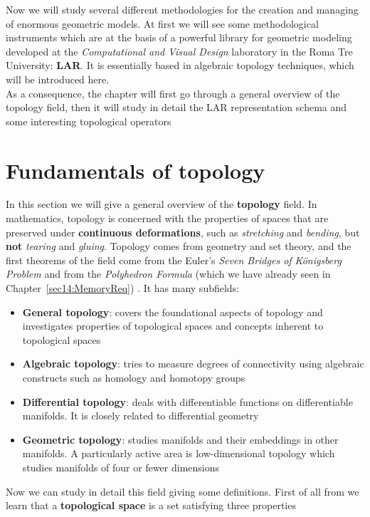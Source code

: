 Now we will study several different methodologies for the creation and managing of enormous geometric models. At first we will see some methodological instruments which are at the basis of a powerful library for geometric modeling developed at the \textit{Computational and Visual Design} laboratory in the Roma Tre University: \textbf{LAR}. It is essentially based in algebraic topology techniques, which will be introduced here.\\

As a consequence, the chapter will first go through a general overview of the topology field, then it will study in detail the LAR representation schema and some interesting topological operators

\section{Fundamentals of topology}\label{sec21:topologicalAlgebra}

In this section we will give a general overview of the \textbf{topology} field. In mathematics, topology is concerned with the properties of spaces that are preserved under \textbf{continuous deformations}, such as \textit{stretching} and \textit{bending}, but \textbf{not} \textit{tearing} and \textit{gluing}. Topology comes from geometry and set theory, and the first theorems of the field come from the Euler's \textit{Seven Bridges of Königsberg Problem} and from the \textit{Polyhedron Formula} (which we have already seen in Chapter~\ref{sec14:MemoryReq}) . It has many subfields:
\begin{itemize}
 \item \textbf{General topology}: covers the foundational aspects of topology and investigates properties of topological spaces and concepts inherent to topological spaces
 \item \textbf{Algebraic topology}: tries to measure degrees of connectivity using algebraic constructs such as homology and homotopy groups
 \item \textbf{Differential topology}: deals with differentiable functions on differentiable manifolds. It is closely related to differential geometry
 \item \textbf{Geometric topology}: studies manifolds and their embeddings in other manifolds. A particularly active area is low-dimensional topology which studies manifolds of four or fewer dimensions
\end{itemize}

Now we can study in detail this field giving some definitions.
First of all from \cite{Kosniowski} we learn that a \textbf{topological space} is a set satisfying three properties

